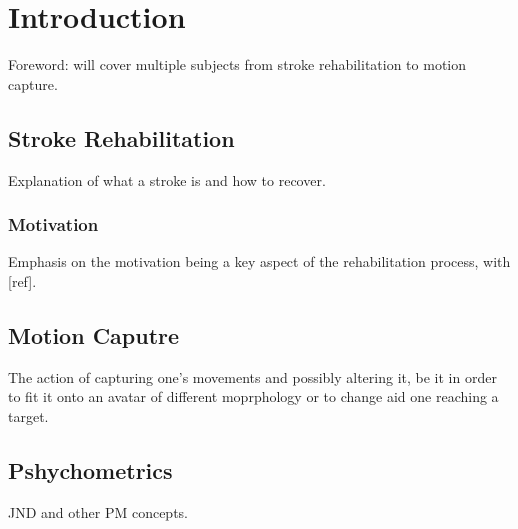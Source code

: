 
\chapter{Introduction} %

\label{Chapter1} %


Foreword: will cover multiple subjects from stroke rehabilitation to motion capture.

\section{Stroke Rehabilitation}

Explanation of what a stroke is and how to recover.

\subsection{Motivation}

Emphasis on the motivation being a key aspect of the rehabilitation process,
with [ref].

\section{Motion Caputre}

The action of capturing one's movements and possibly altering it, be it in order to fit
it onto an avatar of different moprphology or to change aid one reaching a target.

\section{Pshychometrics}

JND and other PM concepts.
